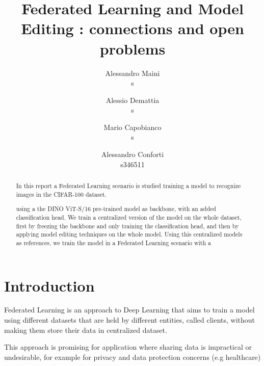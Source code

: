 \documentclass[10pt,twocolumn,letterpaper]{article}
\begin{document}
\title{Federated Learning and Model Editing : connections and open problems}

\author{
	Alessandro Maini\\
	s\\
	\and
	Alessio Demattia\\
	s\\
	\and
	Mario Capobianco\\
	s\\
	\and
	Alessandro Conforti\\
	s346511\\
}
\maketitle

\begin{abstract}
   In this report a Federated Learning scenario is studied training a model to recognize images in the CIFAR-100 dataset. 
   
   

   using a the DINO ViT-S/16 pre-trained model as backbone, with an added classification head. 
   We train a centralized version of the model on the whole dataset, first by freezing the backbone and 
   only training the classification head, and then by applying model editing techniques on the whole model.
   Using this centralized models as references, we train the model in a Federated Learning scenario with a 
   
   
   
\end{abstract}

\section{Introduction}

Federated Learning is an approach to Deep Learning that aims to train a model using different datasets that are held by different entities, called clients, without making them store their data in centralized dataset.

This approach is promising for application where sharing data is impractical or undesirable, for example for privacy and data protection concerns (e.g healthcare) 
\end{document}
